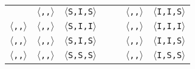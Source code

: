\begin{tabular}{|c|c|c|c|c|c|c|}
& \texttt{$\langle$\benchs{},\benchi{},\benchx{}$\rangle$}
& \texttt{$\langle$S,I,S$\rangle$}

&
&

& \texttt{$\langle$\benchi{},\benchi{},\benchs{}$\rangle$}
& \texttt{$\langle$I,I,S$\rangle$}
\\
\cline{1-3}
\cline{6-7}

\texttt{$\langle$\benchx{},\benchi{},\benchi{}$\rangle$}

& \texttt{$\langle$\benchx{},\benchi{},\benchi{}$\rangle$}
& \texttt{$\langle$S,I,I$\rangle$}

&
&

& \texttt{$\langle$\benchi{},\benchi{},\benchi{}$\rangle$}
& \texttt{$\langle$I,I,I$\rangle$}
\\
\cline{1-3}
\cline{6-7}


\texttt{$\langle$\benchi{},\benchi{},\benchx{}$\rangle$}

& \texttt{$\langle$\benchs{},\benchi{},\benchx{}$\rangle$}
& \texttt{$\langle$S,I,S$\rangle$}

&
&

& \texttt{$\langle$\benchi{},\benchi{},\benchx{}$\rangle$}
& \texttt{$\langle$I,I,S$\rangle$}
\\
\cline{1-3}
\cline{6-7}

\texttt{$\langle$\benchi{},\benchs{},\benchx{}$\rangle$}

& \texttt{$\langle$\benchs{},\benchx{},\benchx{}$\rangle$}
& \texttt{$\langle$S,S,S$\rangle$}

&
&

& \texttt{$\langle$\benchi{},\benchs{},\benchx{}$\rangle$}
& \texttt{$\langle$I,S,S$\rangle$}
\\
\cline{1-3}
\cline{6-7}


\end{tabular}
